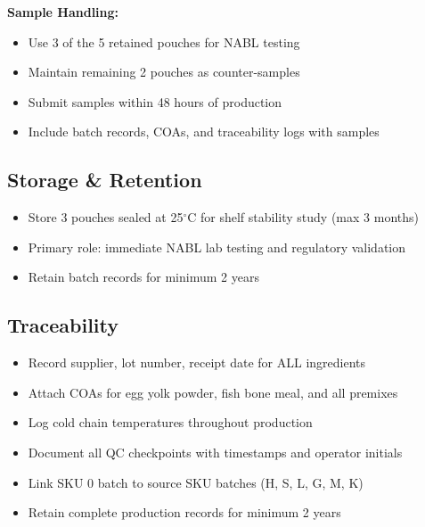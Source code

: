 \textbf{Sample Handling:}
\begin{itemize}
\item Use 3 of the 5 retained pouches for NABL testing
\item Maintain remaining 2 pouches as counter-samples
\item Submit samples within 48 hours of production
\item Include batch records, COAs, and traceability logs with samples
\end{itemize}

\subsection*{Storage \& Retention}
\begin{itemize}
\item Store 3 pouches sealed at 25$^\circ$C for shelf stability study (max 3 months)
\item Primary role: immediate NABL lab testing and regulatory validation
\item Retain batch records for minimum 2 years
\end{itemize}

\subsection*{Traceability}
\begin{itemize}
\item Record supplier, lot number, receipt date for ALL ingredients
\item Attach COAs for egg yolk powder, fish bone meal, and all premixes
\item Log cold chain temperatures throughout production
\item Document all QC checkpoints with timestamps and operator initials
\item Link SKU 0 batch to source SKU batches (H, S, L, G, M, K)
\item Retain complete production records for minimum 2 years
\end{itemize}
